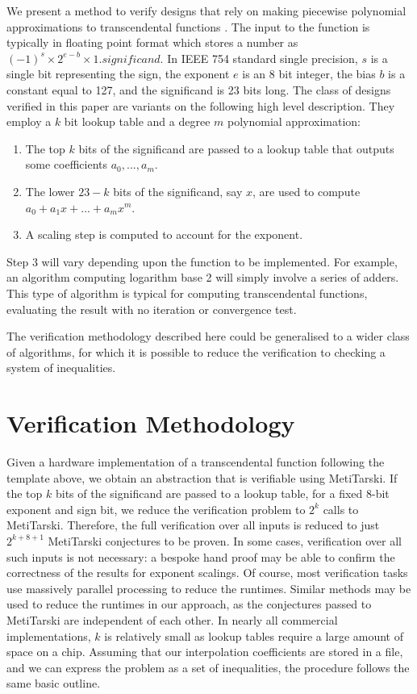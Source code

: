 We present a method to verify designs that rely on making piecewise polynomial approximations to transcendental functions \cite{tang1991table,strollo2011elementary,pineiro2005high}. The input to the function is typically in floating point format \cite{goldberg1991every} which stores a number as $(-1)^{s} \times 2^{e-b} \times 1.\textit{significand}$. In IEEE 754 standard single precision, $s$ is a single bit representing the sign, the exponent $e$ is an 8 bit integer, the bias $b$ is a constant equal to 127, and the significand is 23 bits long. The class of designs verified in this paper are variants on the following high level description. They employ a $k$ bit lookup table and a degree $m$ polynomial approximation:
\begin{enumerate}
\item The top $k$ bits of the significand are passed to a lookup table that outputs some coefficients $a_0,...,a_m$.
\item The lower $23-k$ bits of the significand, say $x$, are used to compute\newline $a_0+a_1x+...+a_mx^m$.
\item A scaling step is computed to account for the exponent.
\end{enumerate} 
Step 3 will vary depending upon the function to be implemented. For example, an algorithm computing logarithm base 2 will simply involve a series of adders. This type of algorithm is typical for computing transcendental functions, evaluating the result with no iteration or convergence test.

The verification methodology described here could be generalised to a wider class of algorithms, for which it is possible to reduce the verification to checking a system of inequalities. 


\section{Verification Methodology}
\label{Method}
Given a hardware implementation of a transcendental function following the template above, we obtain an abstraction that is verifiable using MetiTarski. If the top $k$ bits of the significand are passed to a lookup table, for a fixed 8-bit exponent and sign bit, we reduce the verification problem to $2^k$ calls to MetiTarski. Therefore, the  full verification over all inputs is reduced to 
just $2^{k+8+1}$ MetiTarski conjectures to be proven. In some cases, verification over all such inputs is not necessary: a bespoke hand proof may be able to confirm the correctness of the results for exponent scalings. Of course, most verification tasks use massively parallel processing to reduce the runtimes. Similar methods may be used to reduce the runtimes in our approach, as the conjectures passed to MetiTarski are independent of each other. In nearly all commercial implementations, $k$ is relatively small as lookup tables require a large amount of space on a chip. Assuming that our interpolation coefficients are stored in a file, and we can express the problem as a set of inequalities, the procedure follows the same basic outline.


